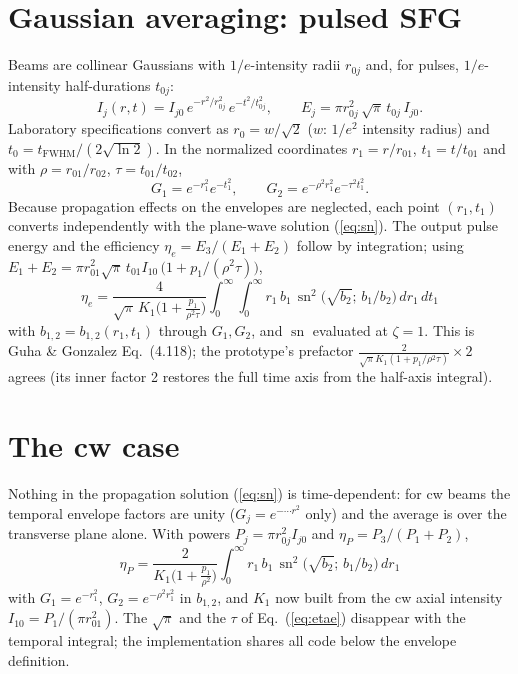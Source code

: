 \documentclass[aps,pra,preprint,amsmath,amssymb,nofootinbib,superscriptaddress]{revtex4-2}
\newcommand{\sn}{\operatorname{sn}}
\begin{document}
\section{Gaussian averaging: pulsed SFG}\label{sec:avg}

Beams are collinear Gaussians with $1/e$-intensity radii $r_{0j}$ and, for
pulses, $1/e$-intensity half-durations $t_{0j}$:
\begin{equation}
I_j(r,t)=I_{j0}\,e^{-r^{2}/r_{0j}^{2}}\,e^{-t^{2}/t_{0j}^{2}},
\qquad
E_j=\pi r_{0j}^{2}\,\sqrt{\pi}\,t_{0j}\,I_{j0}.
\label{eq:gauss}
\end{equation}
Laboratory specifications convert as $r_0=w/\sqrt2$ ($w$: $1/e^{2}$
intensity radius) and $t_0=t_{\mathrm{FWHM}}/(2\sqrt{\ln 2})$. In the
normalized coordinates $r_1=r/r_{01}$, $t_1=t/t_{01}$ and with
$\rho=r_{01}/r_{02}$, $\tau=t_{01}/t_{02}$,
\begin{equation}
G_1=e^{-r_1^{2}}e^{-t_1^{2}},\qquad
G_2=e^{-\rho^{2}r_1^{2}}e^{-\tau^{2}t_1^{2}} .
\end{equation}
Because propagation effects on the envelopes are neglected, each point
$(r_1,t_1)$ converts independently with the plane-wave solution
(\ref{eq:sn}). The output pulse energy and the efficiency
$\eta_e = E_3/(E_1+E_2)$ follow by integration; using
$E_1+E_2=\pi r_{01}^2\sqrt{\pi}\,t_{01} I_{10}\,
\big(1+p_1/(\rho^{2}\tau)\big)$,
\begin{equation}
\boxed{\;
\eta_e=\frac{4}{\sqrt{\pi}\,K_1\big(1+\frac{p_1}{\rho^{2}\tau}\big)}
\int_0^{\infty}\!\!\int_0^{\infty}
r_1\,b_1\,\sn^{2}\!\big(\sqrt{b_2};\,b_1/b_2\big)\,dr_1\,dt_1 \; }
\label{eq:etae}
\end{equation}
with $b_{1,2}=b_{1,2}(r_1,t_1)$ through $G_1,G_2$, and $\sn$ evaluated at
$\zeta=1$. This is Guha \& Gonzalez Eq.~(4.118); the prototype's prefactor
$\tfrac{2}{\sqrt\pi K_1(1+p_1/\rho^2\tau)}\times 2$ agrees (its inner
factor 2 restores the full time axis from the half-axis integral).

\section{The cw case}\label{sec:cw}

Nothing in the propagation solution (\ref{eq:sn}) is time-dependent: for cw
beams the temporal envelope factors are unity ($G_j=e^{-\cdots r^2}$ only)
and the average is over the transverse plane alone. With powers
$P_j=\pi r_{0j}^{2} I_{j0}$ and $\eta_P=P_3/(P_1+P_2)$,
\begin{equation}
\boxed{\;
\eta_P=\frac{2}{K_1\big(1+\frac{p_1}{\rho^{2}}\big)}
\int_0^{\infty} r_1\, b_1\,\sn^{2}\!\big(\sqrt{b_2};\,b_1/b_2\big)\,
dr_1 \;}
\label{eq:etacw}
\end{equation}
with $G_1=e^{-r_1^2}$, $G_2=e^{-\rho^2 r_1^2}$ in $b_{1,2}$, and $K_1$ now
built from the cw axial intensity $I_{10}=P_1/(\pi r_{01}^{2})$. The
$\sqrt{\pi}$ and the $\tau$ of Eq.~(\ref{eq:etae}) disappear with the
temporal integral; the implementation shares all code below the envelope
definition.
\end{document}
